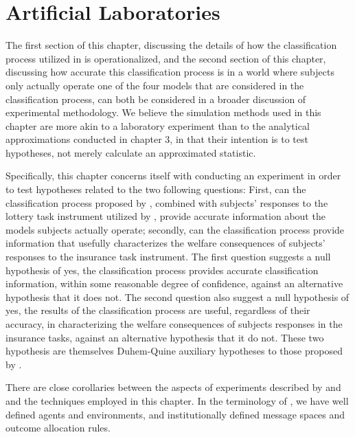 \documentclass[../main.tex]{subfiles}
\begin{document}
\section{Artificial Laboratories}

The first section of this chapter, discussing the details of how the classification process utilized in \textcite{Harrison2016} is operationalized, and the second section of this chapter, discussing how accurate this classification process is in a world where subjects only actually operate one of the four models that are considered in the classification process, can both be considered in a broader discussion of experimental methodology.
We believe the simulation methods used in this chapter are more akin to a laboratory experiment than to the analytical approximations conducted in chapter 3, in that their intention is to test hypotheses, not merely calculate an approximated statistic.

Specifically, this chapter concerns itself with conducting an experiment in order to test hypotheses related to the two following questions:
First, can the classification process proposed by \textcite{Harrison2016}, combined with subjects' responses to the lottery task instrument utilized by \textcite{Harrison2016}, provide accurate information about the models subjects actually operate;
secondly, can the classification process provide information that usefully characterizes the welfare consequences of subjects' responses to the insurance task instrument.
The first question suggests a null hypothesis of yes, the classification process provides accurate classification information, within some reasonable degree of confidence, against an alternative hypothesis that it does not.
The second question also suggest a null hypothesis of yes, the results of the classification process are useful, regardless of their accuracy, in characterizing the welfare consequences of subjects responses in the insurance tasks, against an alternative hypothesis that it do not.
These two hypothesis are themselves Duhem-Quine \parencite{Duhem1954, Quine1953} auxiliary hypotheses to those proposed by \textcite{Harrison2016}.

There are close corollaries between the aspects of experiments described by \textcite{Harrison2004} and \textcite{Smith1982} and the techniques employed in this chapter.
In the terminology of \textcite{Smith1982, 924-927}, we have well defined agents and environments, and institutionally defined message spaces and outcome allocation rules.
\end{document}
